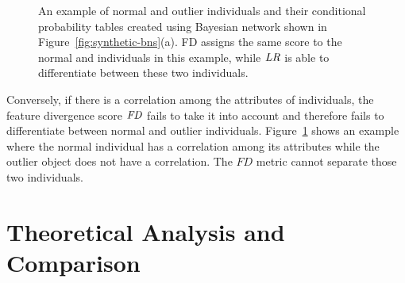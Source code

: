 {%

\begin{figure*}[htbp]
	\centering
	\caption{An example of normal and outlier individuals and  their conditional probability tables  created using Bayesian network shown in Figure~\ref{fig:synthetic-bns}(a). FD assigns the same score to the normal and individuals in this example, while $\it{LR}$ is able to differentiate between these two individuals.
		\label{fig:fdfails}}
\end{figure*}
Conversely, if there is a correlation among the attributes of individuals, the feature divergence score $\it{FD}$ fails to take it into account and therefore fails to differentiate between normal and outlier individuals. Figure~\ref{fig:fdfails} shows an example where the normal individual has a correlation among its attributes while the outlier object does not have a correlation. The $\textit{FD}$ metric cannot separate  those two individuals.

\section{Theoretical Analysis and Comparison} \label{sec:theory}

}
